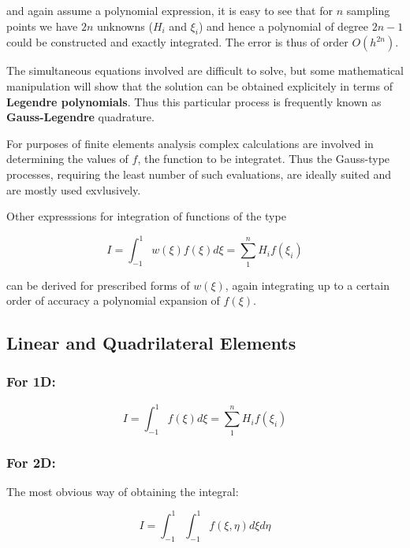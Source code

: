 \documentclass[10pt,b5paper,titlepage]{book}
\begin{document}
and again assume a polynomial expression, it is easy to see that for $ n $ sampling
points we have $ 2n $ unknowns ($H_i$ and $\xi_i$) and hence a polynomial of degree
$ 2n-1 $ could be constructed and exactly integrated. The error is thus of order
$ O(h^{2n}) $.

The simultaneous equations involved are difficult to solve, but some mathematical
manipulation will show that the solution can be obtained explicitely in terms
of \textbf{Legendre polynomials}. Thus this particular process is frequently known
as \textbf{Gauss-Legendre} quadrature.

For purposes of finite elements analysis complex calculations are involved in
determining the values of $ f $, the function to be integratet. Thus the
Gauss-type processes, requiring the least number of such evaluations, are ideally
suited and are mostly used exvlusively.

Other expresssions for integration of functions of the type

\begin{equation}\label{leggaus}
    I = \int_{-1}^{1} w(\xi) f(\xi) d\xi = \sum_{1}^{n} H_i f(\xi_i)
\end{equation}

can be derived for prescribed forms of $ w(\xi) $, again integrating up to a certain
order of accuracy a polynomial expansion of $ f(\xi) $.


\subsection{Linear and Quadrilateral Elements}

\subsubsection{For 1D:}

\begin{equation}
    I = \int_{-1}^{1} f(\xi) d\xi = \sum_1^n H_i f(\xi_i)
\end{equation}


\subsubsection{For 2D:}

The most obvious way of obtaining the integral:

\begin{equation}
    I = \int_{-1}^{1} \int_{-1}^{1} f(\xi, \eta) d\xi d\eta
\end{equation}
\end{document}
